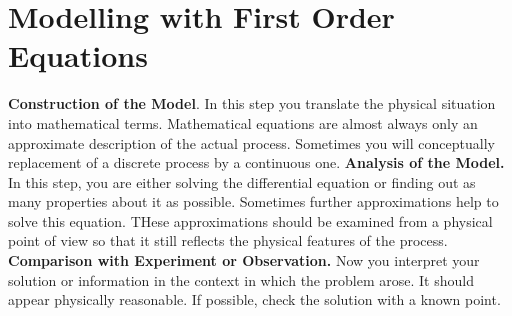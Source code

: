 \section{Modelling with First Order Equations}
    \textbf{Construction of the Model}. In this step you translate the physical situation into mathematical terms. Mathematical equations are almost always only an approximate description of the actual process. Sometimes you will conceptually replacement of a discrete process by a continuous one.
    \newline \indent
    \textbf{Analysis of the Model.} In this step, you are either solving the differential equation or finding out as many properties about it as possible. Sometimes further approximations help to solve this equation. THese approximations should be examined from a physical point of view so that it still reflects the physical features of the process.
    \newline \indent
    \textbf{Comparison with Experiment or Observation. } Now you interpret your solution or information in the context in which the problem arose. It should appear physically reasonable. If possible, check the solution with a known point.